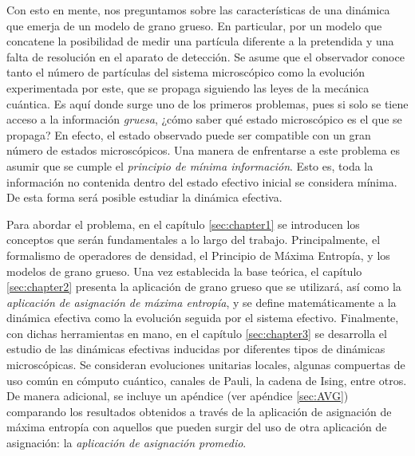 

Con esto en mente, nos preguntamos sobre las características de una dinámica que emerja de un modelo de grano grueso. En particular, por un modelo que concatene la posibilidad de medir una partícula diferente a la pretendida y una falta de resolución en el aparato de detección. Se asume que el observador conoce tanto el número de partículas del sistema microscópico como la evolución experimentada por este, que se propaga siguiendo las leyes de la mecánica cuántica. Es aquí donde surge uno de los primeros problemas, pues si solo se tiene acceso a la información \textit{gruesa}, ¿cómo saber qué estado microscópico es el que se propaga? En efecto, el estado observado puede ser compatible con un gran número de estados microscópicos. Una manera de enfrentarse a este problema es asumir que se cumple el \textit{principio de mínima información}. Esto es, toda la información no contenida dentro del estado efectivo inicial se considera mínima. De esta forma será posible estudiar la dinámica efectiva. 



Para abordar el problema, en el capítulo \ref{sec:chapter1} se introducen los conceptos que serán fundamentales a lo largo del trabajo. Principalmente, el formalismo de operadores de densidad, el Principio de Máxima Entropía, y los modelos de grano grueso. Una vez establecida la base teórica, el capítulo \ref{sec:chapter2} presenta la aplicación de grano grueso que se utilizará, así como la \textit{aplicación de asignación de máxima entropía}, y se define matemáticamente a la dinámica efectiva como la evolución seguida por el sistema efectivo. Finalmente, con dichas herramientas en mano, en el capítulo \ref{sec:chapter3} se desarrolla el estudio de las dinámicas efectivas inducidas por diferentes tipos de dinámicas microscópicas. Se consideran evoluciones unitarias locales, algunas compuertas de uso común en cómputo cuántico, canales de Pauli, la cadena de Ising, entre otros. De manera adicional, se incluye un apéndice (ver apéndice \ref{sec:AVG}) comparando los resultados obtenidos a través de la aplicación de asignación de máxima entropía con aquellos que pueden surgir del uso de otra aplicación de asignación: la \textit{aplicación de asignación promedio}.